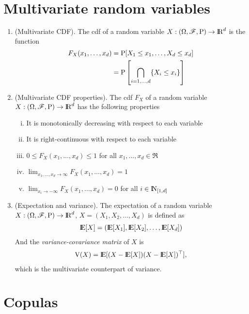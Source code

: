 \documentclass[a4paper,10pt]{scrbook}
\begin{document}
\section{Multivariate random variables}
\begin{enumerate}
 \item (Multivariate CDF). The cdf of a random variable \(X:\ofp\to\Re^d\) is the function 
       \begin{align*}
        F_X(x_1, \ldots, x_d) {}={}& \mathrm{P}[X_1\leq x_1, \ldots, X_d \leq x_d]
        \\
        {}={}& \mathrm{P}\left[\bigcap_{i=1,\ldots, d} \{X_i \leq x_i\}\right]
       \end{align*}
 \item (Multivariate CDF properties). The cdf \(F_X\) of a random variable \(X:\ofp\to\Re^d\)  
       has the following properties
       \begin{enumerate}[i.]
        \item It is monotonically decreasing with respect to each variable
        \item It is right-continuous with respect to each variable
        \item \(0 \leq F_X(x_1, \ldots, x_d)\leq 1\) for all \(x_1,\ldots, x_d\in\Re\)
        \item \(\lim_{x_1,\ldots, x_d\to\infty} F_X(x_1, \ldots, x_d) = 1\)
        \item \(\lim_{x_i\to-\infty} F_X(x_1, \ldots, x_d) = 0\) for all \(i\in\N_{[1,d]}\)
       \end{enumerate}
 \item (Expectation and variance). The expectation of a random variable \(X:\ofp\to\Re^d\), 
       \(X = (X_1, X_2,\ldots, X_d)\) is defined as 
       \[
        \E[X] = (\E[X_1], \E[X_2], \ldots, \E[X_d])
       \]
       And the \textit{variance-covariance matrix} of \(X\) is 
       \[
        \mathrm{V}(X) = \E[(X-\E[X])(X-\E[X])^{\top}],
       \]
       which is the multivariate counterpart of variance.


\end{enumerate}

\section{Copulas}
\end{document}
